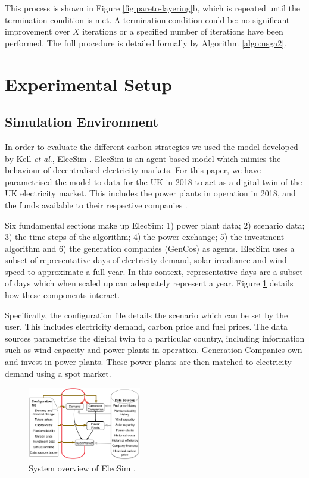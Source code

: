 \documentclass[sigconf]{acmart}
\begin{document}
This process is shown in Figure \ref{fig:pareto-layering}b, which is repeated until the termination condition is met. A termination condition could be:  no significant improvement over $X$ iterations or a specified number of iterations have been performed. The full procedure is detailed formally by Algorithm \ref{algo:nsga2}.



\section{Experimental Setup}
\label{sec:sim_environment}


\subsection{Simulation Environment}
In order to evaluate the different carbon strategies we used the model developed by Kell \textit{et al}., ElecSim \cite{Kell,Kell2020}. ElecSim is an agent-based model which mimics the behaviour of decentralised electricity markets. For this paper, we have parametrised the model to data for the UK in 2018 to act as a digital twin of the UK electricity market. This includes the power plants in operation in 2018, and the funds available to their respective companies \cite{dukes_511, companies_house}.

Six fundamental sections make up ElecSim: 1) power plant data; 2) scenario data; 3) the time-steps of the algorithm; 4) the power exchange; 5) the investment algorithm and 6) the generation companies (GenCos) as agents. ElecSim uses a subset of representative days of electricity demand, solar irradiance and wind speed to approximate a full year. In this context, representative days are a subset of days which when scaled up can adequately represent a year. Figure \ref{fig:model_details} details how these components interact. 

Specifically, the configuration file details the scenario which can be set by the user. This includes electricity demand, carbon price and fuel prices. The data sources parametrise the digital twin to a particular country, including information such as wind capacity and power plants in operation. Generation Companies own and invest in power plants. These power plants are then matched to electricity demand using a spot market.

\begin{figure}
\centering
\includegraphics[width=0.44\textwidth]{figures/setup/System_overview_large.png}
\caption{System overview of ElecSim \cite{Kell}.}
\label{fig:model_details}
\end{figure}
\end{document}
